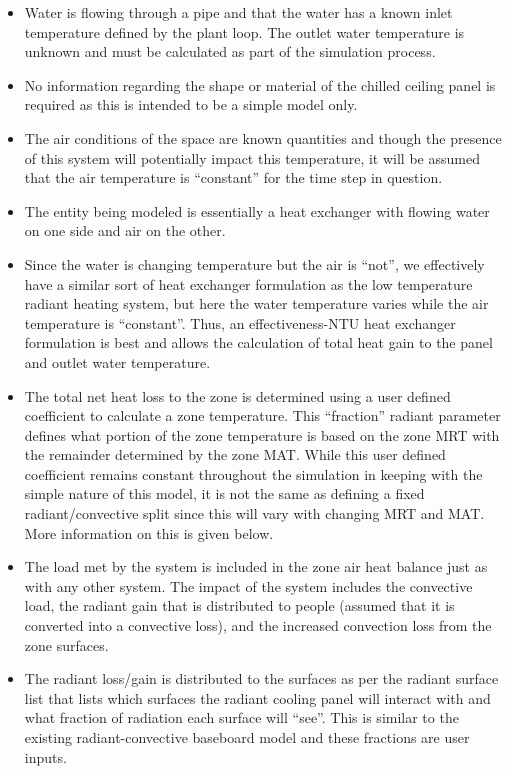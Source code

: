 {\begin{itemize}
\tightlist
\item
  Water is flowing through a pipe and that the water has a known inlet temperature defined by the plant loop.  The outlet water temperature is unknown and must be calculated as part of the simulation process.
\item
  No information regarding the shape or material of the chilled ceiling panel is required as this is intended to be a simple model only.
\item
  The air conditions of the space are known quantities and though the presence of this system will potentially impact this temperature, it will be assumed that the air temperature is “constant” for the time step in question.
\item
  The entity being modeled is essentially a heat exchanger with flowing water on one side and air on the other.
\item
  Since the water is changing temperature but the air is “not”, we effectively have a similar sort of heat exchanger formulation as the low temperature radiant heating system, but here the water temperature varies while the air temperature is “constant”.  Thus, an effectiveness-NTU heat exchanger formulation is best and allows the calculation of total heat gain to the panel and outlet water temperature.
\item
  The total net heat loss to the zone is determined using a user defined coefficient to calculate a zone temperature.  This “fraction” radiant parameter defines what portion of the zone temperature is based on the zone MRT with the remainder determined by the zone MAT.  While this user defined coefficient remains constant throughout the simulation in keeping with the simple nature of this model, it is not the same as defining a fixed radiant/convective split since this will vary with changing MRT and MAT.  More information on this is given below.
\item
  The load met by the system is included in the zone air heat balance just as with any other system.  The impact of the system includes the convective load, the radiant gain that is distributed to people (assumed that it is converted into a convective loss), and the increased convection loss from the zone surfaces.
\item
  The radiant loss/gain is distributed to the surfaces as per the radiant surface list that lists which surfaces the radiant cooling panel will interact with and what fraction of radiation each surface will “see”.  This is similar to the existing radiant-convective baseboard model and these fractions are user inputs.

\end{itemize}}
